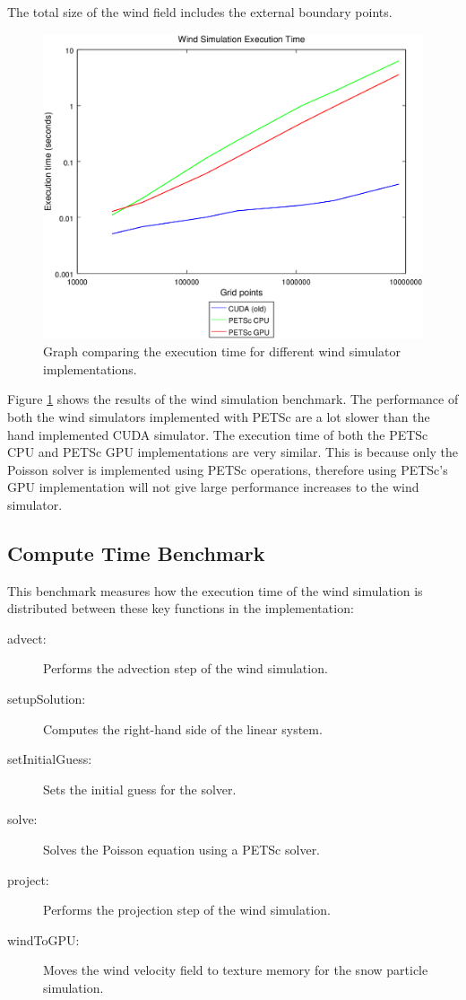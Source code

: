 The total size of the wind field includes the external boundary points.

\begin{figure}[ht]
	\center
	\includegraphics[width=1.0\textwidth]{results/data/wb/exec_time_all}
	\caption{Graph comparing the execution time for different wind simulator
		implementations.}
	\label{fig:wind_sim_time}
\end{figure}

Figure \ref{fig:wind_sim_time} shows the results of the wind simulation benchmark.
The performance of both the wind simulators implemented with PETSc are a lot slower
than the hand implemented CUDA simulator. The execution time of both the PETSc
CPU and PETSc GPU implementations are very similar. This is because only the
Poisson solver is implemented using PETSc operations, therefore using PETSc's 
GPU implementation will not give large performance increases to the wind
simulator.

\subsection{Compute Time Benchmark}

This benchmark measures how the execution time of the wind simulation is distributed
between these key functions in the implementation:
\begin{description}
	\item[advect:] Performs the advection step of the wind simulation.
	\item[setupSolution:] Computes the right-hand side of the linear system.
	\item[setInitialGuess:] Sets the initial guess for the solver.
	\item[solve:] Solves the Poisson equation using a PETSc solver.
	\item[project:] Performs the projection step of the wind simulation.
	\item[windToGPU:] Moves the wind velocity field to texture memory for the
	snow particle simulation.
\end{description}

